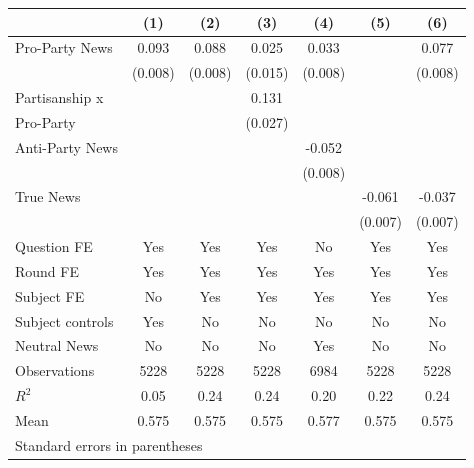 \begin{tabular}{l*{6}{c}}
\hline\hline
                    &\multicolumn{1}{c}{(1)}&\multicolumn{1}{c}{(2)}&\multicolumn{1}{c}{(3)}&\multicolumn{1}{c}{(4)}&\multicolumn{1}{c}{(5)}&\multicolumn{1}{c}{(6)}\\
\hline
Pro-Party News      &    0.093&    0.088&    0.025&    0.033&         &    0.077\\
                    &  (0.008)&  (0.008)&  (0.015)&  (0.008)&         &  (0.008)\\
Partisanship x      &         &         &    0.131&         &         &         \\
Pro-Party           &         &         &  (0.027)&         &         &         \\
Anti-Party News     &         &         &         &   -0.052&         &         \\
                    &         &         &         &  (0.008)&         &         \\
True News           &         &         &         &         &   -0.061&   -0.037\\
                    &         &         &         &         &  (0.007)&  (0.007)\\
Question FE         &      Yes&      Yes&      Yes&       No&      Yes&      Yes\\
Round FE            &      Yes&      Yes&      Yes&      Yes&      Yes&      Yes\\
Subject FE          &       No&      Yes&      Yes&      Yes&      Yes&      Yes\\
Subject controls    &      Yes&       No&       No&       No&       No&       No\\
Neutral News        &       No&       No&       No&      Yes&       No&       No\\
\hline
Observations        &     5228&     5228&     5228&     6984&     5228&     5228\\
\(R^{2}\)           &     0.05&     0.24&     0.24&     0.20&     0.22&     0.24\\
Mean                &    0.575&    0.575&    0.575&    0.577&    0.575&    0.575\\
\hline\hline
\multicolumn{7}{l}{\footnotesize Standard errors in parentheses}\\
\end{tabular}
